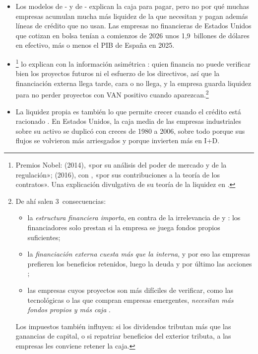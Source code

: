 \documentclass[11pt]{article}
\begin{document}
\begin{itemize}
\item Los modelos de - y de - explican la caja para pagar, pero no por qué muchas empresas acumulan mucha más liquidez de la que necesitan y pagan además líneas de crédito que no usan. Las empresas no financieras de Estados Unidos que cotizan en bolsa tenían a comienzos de 2026 unos 1,9~billones de dólares en efectivo\nocite{Damodaran2026Cash}, más o menos el PIB de España en 2025\nocite{FMI2026DataMapper}.
\item \textcite{HolmstromTirole2011Inside}\footnote{Premios Nobel:  (2014), «por su análisis del poder de mercado y de la regulación»\nocite{Nobel2014Tirole};  (2016), con , «por sus contribuciones a la teoría de los contratos»\nocite{Nobel2016HartHolmstrom}. Una explicación divulgativa de su teoría de la liquidez en \textcite{FernandezVillaverde2016Liquidez}.} lo explican con la información asimétrica : quien financia no puede verificar bien los proyectos futuros ni el esfuerzo de los directivos, así que la financiación externa llega tarde, cara o no llega, y la empresa guarda liquidez para no perder proyectos con VAN positivo cuando aparezcan.\footnote{De ahí salen 3~consecuencias:
\begin{itemize}
\item la \emph{estructura financiera importa}, en contra de la irrelevancia de  y : los financiadores solo prestan si la empresa se juega fondos propios suficientes\nocite{HolmstromTirole1997Financial};
\item la \emph{financiación externa cuesta más que la interna}, y por eso las empresas prefieren los beneficios retenidos, luego la deuda y por último las acciones\nocite{MyersMajluf1984Corporate} ;
\item las empresas cuyos proyectos son más difíciles de verificar, como las tecnológicas o las que compran empresas emergentes, \emph{necesitan más fondos propios y más caja} .
\end{itemize}
Los impuestos también influyen: si los dividendos tributan más que las ganancias de capital, o si repatriar beneficios del exterior tributa, a las empresas les conviene retener la caja.}
\item La liquidez propia es también lo que permite crecer cuando el crédito está racionado . En Estados Unidos, la caja media de las empresas industriales sobre su activo se duplicó con creces de 1980 a 2006, sobre todo porque sus flujos se volvieron más arriesgados y porque invierten más en I+D\nocite{BatesKahleStulz2009Why}.
\end{itemize}
\end{document}
